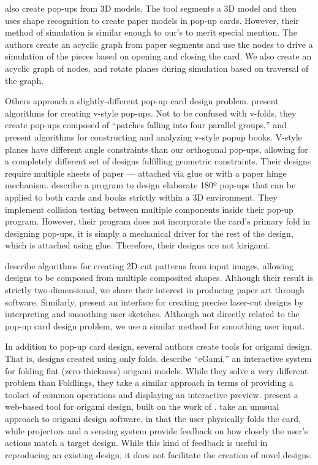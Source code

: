 \citet{way2013creation} also create pop-ups from 3D models. The tool
segments a 3D model and then uses shape recognition to create paper
models in pop-up cards. However, their method of simulation is similar
enough to our's to merit special mention. The authors create an acyclic
graph from paper segments and use the nodes to drive a simulation of the
pieces based on opening and closing the card. We also create an acyclic
graph of nodes, and rotate planes during simulation based on traversal
of the graph.

Others approach a slightly-different pop-up card design problem.
\citet{li2011geometric} present algorithms for creating v-style pop-ups.
Not to be confused with v-folds, they create pop-ups composed of
``patches falling into four parallel groups,'' and present algorithms
for constructing and analyzing v-style popup books. V-style planes have
different angle constraints than our orthogonal pop-ups, allowing for a
completely different set of designs fulfilling geometric constraints.
Their designs require multiple sheets of paper --- attached via glue or
with a paper hinge mechanism. \citet{okamura2009interface} describe a
program to design elaborate 180º pop-ups that can be applied to both
cards and books strictly within a 3D environment. They implement
collision testing between multiple components inside their pop-up
program. However, their program does not incorporate the card's primary
fold in designing pop-ups, it is simply a mechanical driver for the rest
of the design, which is attached using glue. Therefore, their designs
are not kirigami.

\citet{xu2007computer} describe algorithms for creating 2D cut patterns
from input images, allowing designs to be composed from multiple
composited shapes. Although their result is strictly two-dimensional, we
share their interest in producing paper art through software. Similarly,
\citet{johnson2012sketch} present an interface for creating precise
laser-cut designs by interpreting and smoothing user sketches. Although
not directly related to the pop-up card design problem, we use a similar
method for smoothing user input.

In addition to pop-up card design, several authors create tools for
origami design. That is, designs created using only folds.
\citet{fastag2009egami} describe ``eGami,'' an interactive system for
folding flat (zero-thickness) origami models. While they solve a very
different problem than Foldlings, they take a similar approach in terms
of providing a toolset of common operations and displaying an
interactive preview. \citet{kasem2008computational} present a web-based
tool for origami design, built on the work of
\citet{zamiatina1994computer}. \citet{ju2002origami} take an unusual
approach to origami design software, in that the user physically folds
the card, while projectors and a sensing system provide feedback on how
closely the user's actions match a target design. While this kind of
feedback is useful in reproducing an existing design, it does not
facilitate the creation of novel designs.

